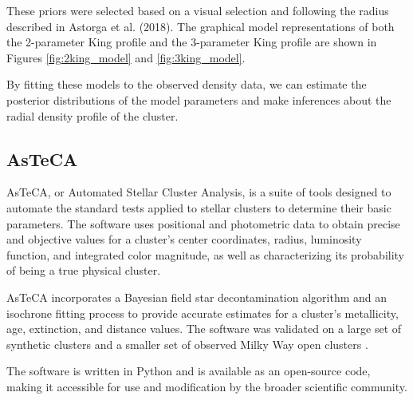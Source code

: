 \documentclass[fleqn,usenatbib,usedcolumn,useAMS]{mnras}
\begin{document}
These priors were selected based on a visual selection and following the radius described in Astorga et al. (2018). The graphical model representations of both the 2-parameter King profile and the 3-parameter King profile are shown in Figures \ref{fig:2king_model} and \ref{fig:3king_model}.

By fitting these models to the observed density data, we can estimate the posterior distributions of the model parameters and make inferences about the radial density profile of the cluster.

\subsection{AsTeCA}
AsTeCA, or Automated Stellar Cluster Analysis, is a suite of tools designed to automate the standard tests applied to stellar clusters to determine their basic parameters. The software uses positional and photometric data to obtain precise and objective values for a cluster's center coordinates, radius, luminosity function, and integrated color magnitude, as well as characterizing its probability of being a true physical cluster.

AsTeCA incorporates a Bayesian field star decontamination algorithm and an isochrone fitting process to provide accurate estimates for a cluster's metallicity, age, extinction, and distance values. The software was validated on a large set of synthetic clusters and a smaller set of observed Milky Way open clusters \cite{2015A&A...576A...6P}.

The software is written in Python and is available as an open-source code, making it accessible for use and modification by the broader scientific community.
\end{document}
